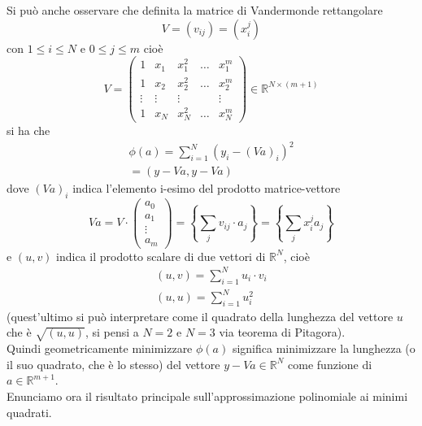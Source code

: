 \documentclass[12pt,a4paper]{article}
\begin{document}
Si può anche osservare che definita la matrice di Vandermonde rettangolare
\[
V = (v_{ij}) = (x_i^j)
\]
con $1 \leq i \leq N$ e $0 \leq j \leq m$ cioè\\
\[
V = 
\begin{pmatrix}
1 & x_1 & x_1^2 & \dotso & x_1^m \\
1 & x_2 & x_2^2 & \dotso & x_2^m \\
\vdots & \vdots & \vdots & & \vdots \\
1 & x_N & x_N^2 & \dotso & x_N^m
\end{pmatrix}
\in \mathbb{R}^{N \times (m+1)}
\]
si ha che
\[
\begin{split}
    \phi (a) = \sum_{i=1}^N (y_i - (Va)_i)^2\\
    = (y - Va, y - Va)
\end{split}
\]
dove $(Va)_i$ indica l'elemento i-esimo
del prodotto matrice-vettore
\[
Va = V \cdot 
\begin{pmatrix}
a_0 \\ a_1 \\ \vdots \\ a_m
\end{pmatrix}
= \left \{ \sum_j v_{ij} \cdot a_j \right \} = \left \{ \sum_j x_i^j a_j \right \}
\]
e $(u,v)$ indica il prodotto scalare di due vettori di $\mathbb{R}^N$, cioè 
\[
\begin{split}
(u,v) = \sum\limits_{i=1}^N u_i \cdot v_i \\
(u,u) = \sum\limits_{i=1}^N u_i^2
\end{split}
\]
(quest'ultimo si può interpretare come il quadrato della lunghezza del vettore $u$ che è $\sqrt{(u,u)}$, si pensi a $N=2$ e $N=3$ via teorema di Pitagora).\\
Quindi geometricamente minimizzare $\phi(a)$ significa minimizzare la
lunghezza (o il suo quadrato, che è lo stesso) del vettore $y - Va \in \mathbb{R}^N$ come funzione di $a \in \mathbb{R}^{m+1}$.\\
Enunciamo ora il risultato principale sull'approssimazione polinomiale ai minimi quadrati.
\end{document}
